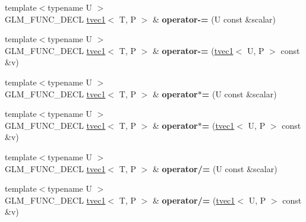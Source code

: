 \begin{DoxyCompactItemize}
\item 
\hypertarget{structglm_1_1tvec1_ab282998a9e9ce8d9503d124029aa79a7}{{\footnotesize template$<$typename U $>$ }\\G\-L\-M\-\_\-\-F\-U\-N\-C\-\_\-\-D\-E\-C\-L \hyperlink{structglm_1_1tvec1}{tvec1}$<$ T, P $>$ \& {\bfseries operator-\/=} (U const \&scalar)}\label{structglm_1_1tvec1_ab282998a9e9ce8d9503d124029aa79a7}

\item 
\hypertarget{structglm_1_1tvec1_ad2c5971147b89ac3a660d88296ec2a74}{{\footnotesize template$<$typename U $>$ }\\G\-L\-M\-\_\-\-F\-U\-N\-C\-\_\-\-D\-E\-C\-L \hyperlink{structglm_1_1tvec1}{tvec1}$<$ T, P $>$ \& {\bfseries operator-\/=} (\hyperlink{structglm_1_1tvec1}{tvec1}$<$ U, P $>$ const \&v)}\label{structglm_1_1tvec1_ad2c5971147b89ac3a660d88296ec2a74}

\item 
\hypertarget{structglm_1_1tvec1_a8eeebd29c91ffc0ebe31a81c0b8138de}{{\footnotesize template$<$typename U $>$ }\\G\-L\-M\-\_\-\-F\-U\-N\-C\-\_\-\-D\-E\-C\-L \hyperlink{structglm_1_1tvec1}{tvec1}$<$ T, P $>$ \& {\bfseries operator$\ast$=} (U const \&scalar)}\label{structglm_1_1tvec1_a8eeebd29c91ffc0ebe31a81c0b8138de}

\item 
\hypertarget{structglm_1_1tvec1_a3b881fe292b87649ebff1981800039ac}{{\footnotesize template$<$typename U $>$ }\\G\-L\-M\-\_\-\-F\-U\-N\-C\-\_\-\-D\-E\-C\-L \hyperlink{structglm_1_1tvec1}{tvec1}$<$ T, P $>$ \& {\bfseries operator$\ast$=} (\hyperlink{structglm_1_1tvec1}{tvec1}$<$ U, P $>$ const \&v)}\label{structglm_1_1tvec1_a3b881fe292b87649ebff1981800039ac}

\item 
\hypertarget{structglm_1_1tvec1_a9ad08b34c0331c45f43c5d8fb796fc5b}{{\footnotesize template$<$typename U $>$ }\\G\-L\-M\-\_\-\-F\-U\-N\-C\-\_\-\-D\-E\-C\-L \hyperlink{structglm_1_1tvec1}{tvec1}$<$ T, P $>$ \& {\bfseries operator/=} (U const \&scalar)}\label{structglm_1_1tvec1_a9ad08b34c0331c45f43c5d8fb796fc5b}

\item 
\hypertarget{structglm_1_1tvec1_a09ef15d7a57cbcf441eb01d3fc832b5d}{{\footnotesize template$<$typename U $>$ }\\G\-L\-M\-\_\-\-F\-U\-N\-C\-\_\-\-D\-E\-C\-L \hyperlink{structglm_1_1tvec1}{tvec1}$<$ T, P $>$ \& {\bfseries operator/=} (\hyperlink{structglm_1_1tvec1}{tvec1}$<$ U, P $>$ const \&v)}\label{structglm_1_1tvec1_a09ef15d7a57cbcf441eb01d3fc832b5d}


\end{DoxyCompactItemize}
